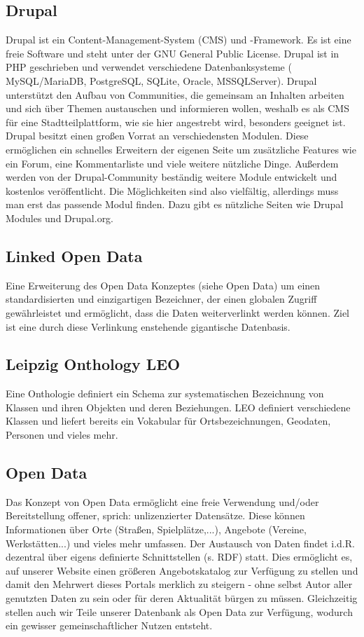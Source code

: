 \documentclass{swp}
\begin{document}
\subsection{Drupal}
Drupal ist ein Content-Management-System (CMS) und -Framework. Es ist eine freie Software und steht unter der GNU General Public License. Drupal ist in PHP geschrieben und verwendet verschiedene Datenbanksysteme ( MySQL/MariaDB, PostgreSQL, SQLite, Oracle, MSSQLServer). Drupal unterst\"utzt den Aufbau von Communities, die gemeinsam an Inhalten arbeiten und sich \"uber Themen austauschen und informieren wollen, weshalb es als CMS f\"ur eine Stadtteilplattform, wie sie hier angestrebt wird, besonders geeignet ist.\\
Drupal besitzt einen gro{\ss}en \glqq Vorrat\grqq{} an verschiedensten Modulen. Diese erm\"oglichen ein schnelles Erweitern der eigenen Seite um zus\"atzliche Features wie ein Forum, eine Kommentarliste und viele weitere n\"utzliche Dinge. Au{\ss}erdem werden von der Drupal-Community best\"andig weitere Module entwickelt und kostenlos ver\"offentlicht. Die M\"oglichkeiten sind also vielf\"altig, allerdings muss man erst das passende Modul finden. Dazu gibt es n\"utzliche Seiten wie Drupal Modules und Drupal.org.
\subsection{Linked Open Data}
Eine Erweiterung des Open Data Konzeptes (siehe Open Data) um einen standardisierten und einzigartigen Bezeichner, der einen globalen Zugriff gew\"ahrleistet und erm\"oglicht, dass die Daten weiterverlinkt werden k\"onnen. Ziel ist eine durch diese Verlinkung enstehende gigantische Datenbasis.
\subsection{Leipzig Onthology LEO}
Eine Onthologie definiert ein Schema zur systematischen Bezeichnung von Klassen und ihren Objekten und deren Beziehungen. 
LEO definiert verschiedene Klassen und liefert bereits ein Vokabular f\"ur Ortsbezeichnungen, Geodaten, Personen und vieles mehr.
\subsection{Open Data}
Das Konzept von Open Data erm\"oglicht eine freie Verwendung und/oder Bereitstellung \glqq offener\grqq{}, sprich: unlizenzierter Datens\"atze. Diese k\"onnen Informationen \"uber Orte (Stra{\ss}en, Spielpl\"atze,...), Angebote (Vereine, Werkst\"atten...) und vieles mehr umfassen. Der Austausch von Daten findet i.d.R. dezentral \"uber eigens definierte Schnittstellen (s. \glqq RDF\grqq{}) statt. Dies erm\"oglicht es, auf unserer Website einen gr\"o{\ss}eren Angebotskatalog zur Verf\"ugung zu stellen und damit den Mehrwert dieses Portals merklich zu steigern - ohne selbst Autor aller genutzten Daten zu sein oder f\"ur deren Aktualit\"at b\"urgen zu m\"ussen. Gleichzeitig stellen auch wir Teile unserer Datenbank als \glqq Open Data\grqq{} zur Verf\"ugung, wodurch ein gewisser gemeinschaftlicher Nutzen entsteht.
\end{document}
